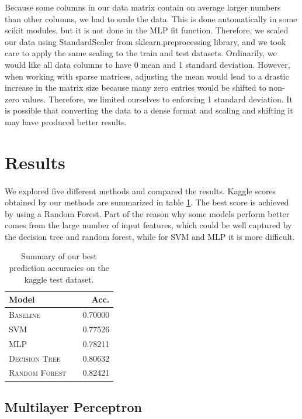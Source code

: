 \documentclass[11pt]{article}
\begin{document}
\noindent Because some columns in our data matrix contain on average larger numbers than other columns, we had to scale the data. This is done automatically in some scikit modules, but it is not done in the MLP fit function. Therefore, we scaled our data using StandardScaler from sklearn.preprocessing library, and we took care to apply the same scaling to the train and test datasets. Ordinarily, we would like all data columns to have 0 mean and 1 standard deviation. However, when working with sparse matrices, adjusting the mean would lead to a drastic increase in the matrix size because many zero entries would be shifted to non-zero values. Therefore, we limited ourselves to enforcing 1 standard deviation. It is possible that converting the data to a dense format and scaling and shifting it may have produced better results. \\



\section{Results}
\paragraph{} We explored five different methods and compared the results. Kaggle scores obtained by our methods are summarized in table \ref{tab:results}. The best score is achieved by using a Random Forest. Part of the reason why some models perform better comes from the large number of input features, which could be well captured by the decision tree and random forest, while for SVM and MLP it is more difficult.

  \begin{table}
\centering
\begin{tabular}{llr}
 \toprule
 Model &  & Acc. \\
 \midrule
 \textsc{Baseline} & & 0.70000\\
 \textsc{SVM} & & 0.77526 \\
 \textsc{MLP} & & 0.78211 \\
 \textsc{Decision Tree} & & 0.80632\\
  \textsc{Random Forest} & &0.82421\\
 \bottomrule
\end{tabular}
\caption{\label{tab:results} Summary of our best prediction accuracies on the kaggle test dataset.}
\end{table}

\subsection{Multilayer Perceptron}
\end{document}
